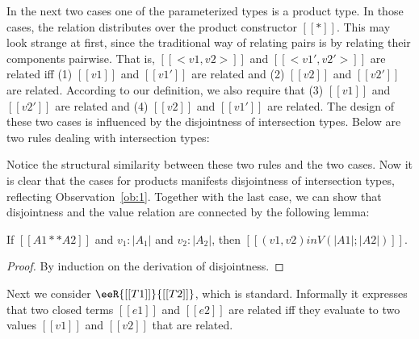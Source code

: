 In the next two cases one of the parameterized types is a product type. In those
cases, the relation distributes over the product constructor $[[*]]$. This may
look strange at first, since the traditional way of relating pairs is by
relating their components pairwise. That is, $[[<v1,v2>]]$ and $[[<v1', v2'>]]$
are related iff (1) $[[v1]]$ and $[[v1']]$ are related and (2) $[[v2]]$ and
$[[v2']]$ are related. According to our definition, we also require that (3)
$[[v1]]$ and $[[v2']]$ are related and (4) $[[v2]]$ and $[[v1']]$ are related.
The design of these two cases is influenced by the disjointness of intersection
types. Below are two rules dealing with intersection types:
Notice the structural similarity between these two rules and the two cases. Now
it is clear that the cases for products manifests disjointness of intersection
types, reflecting Observation~\ref{ob:1}. Together with the last case, we can
show that disjointness and the value relation are connected by the following
lemma:

\begin{lemma}\label{lemma:disjoint}
  If $[[A1 ** A2]]$ and $v_1 : |A_1|$ and $v_2 : |A_2|$, then $[[(v1, v2) in V (|A1| ; |A2|)]]$.
\end{lemma}
\begin{proof}
  By induction on the derivation of disjointness.
\end{proof}

Next we consider $\eeR{[[T1]]}{[[T2]]}$, which is standard. Informally it expresses
that two closed terms $[[e1]]$ and $[[e2]]$ are related iff
they evaluate to two values $[[v1]]$ and $[[v2]]$ that are related.



